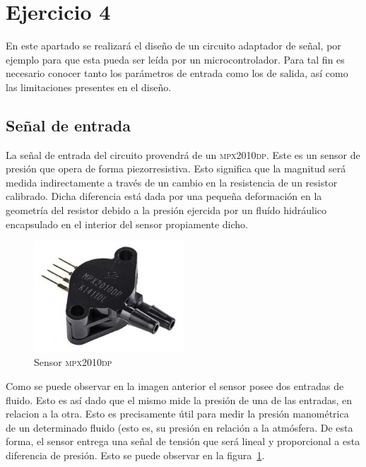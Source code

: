 \section{Ejercicio 4}
En este apartado se realizar\'a el dise\~no de un circuito adaptador de se\~nal, por ejemplo para que esta pueda ser le\'ida por un microcontrolador. Para tal fin es necesario conocer tanto los par\'ametros de entrada como los de salida, as\'i como las limitaciones presentes en el dise\~no.

\subsection{Se\~nal de entrada}
La se\~nal de entrada del circuito provendr\'a de un \textsc{mpx2010dp}. Este es un sensor de presi\'on que opera de forma piezorresistiva. Esto significa que la magnitud ser\'a medida indirectamente a trav\'es de un cambio en la resistencia de un resistor calibrado. Dicha diferencia est\'a dada por una peque\~na deformaci\'on en la geometr\'ia del resistor debido a la presi\'on ejercida por un flu\'ido hidr\'aulico encapsulado en el interior del sensor propiamente dicho.

\begin{figure}[H]
    \centering
    \includegraphics[width=0.5\textwidth]{../EJ4/resources/mpx2010dp.png}
    \caption{Sensor \textsc{mpx2010dp}}
    \label{fig:EJ4_mpx2010dp_image}
\end{figure}

Como se puede observar en la imagen anterior el sensor posee dos entradas de fluido. Esto es as\'i dado que el mismo mide la presi\'on de una de las entradas, en relacion a la otra. Esto es precisamente \'util para medir la presi\'on manom\'etrica de un determinado fluido (esto es, su presi\'on en relaci\'on a la atm\'osfera. De esta forma, el sensor entrega una se\~nal de tensi\'on que ser\'a lineal y proporcional a esta diferencia de presi\'on. Esto se puede observar en la figura~\ref{fig:EJ4_mpx2010dp_image}.

